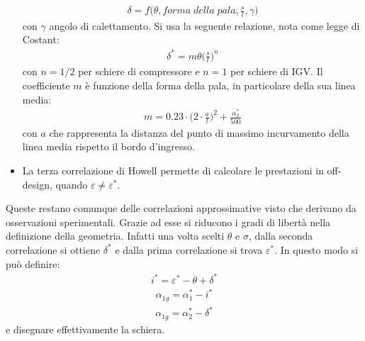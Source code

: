 \begin{itemize}
	\begin{align*}
	\delta = f \bigg( \theta, forma \; della \; pala, \frac{s}{l}, \gamma \bigg)
	\end{align*}
	con $\gamma$ angolo di calettamento. Si usa la seguente relazione, nota come legge di Costant:
	\begin{align*}
	\delta^* = m \theta \bigg( \frac{s}{l} \bigg)^n
	\end{align*}
	con $n = 1/2$ per schiere di compressore e $n = 1$ per schiere di IGV. Il coefficiente $m$ è funzione della forma della pala, in particolare della sua linea media:
	\begin{align*}
	m = 0.23 \cdot \bigg( 2 \cdot \frac{a}{l} \bigg)^2 + \frac{\alpha_2^*}{500}
	\end{align*}
	con $a$ che rappresenta la distanza del punto di massimo incurvamento della linea media rispetto il bordo d'ingresso.
	\item La terza correlazione di Howell permette di calcolare le prestazioni in off-design, quando $\varepsilon \neq \varepsilon^*$.
\end{itemize}
Queste restano comunque delle correlazioni approssimative visto che derivano da osservazioni sperimentali. Grazie ad esse si riducono i gradi di libertà nella definizione della geometria. Infatti una volta scelti $ \theta$ e $\sigma $, dalla seconda correlazione si ottiene $ \delta^* $ e dalla prima correlazione si trova $ \varepsilon^* $. In questo modo si può definire:
\begin{align*}
i^* = \varepsilon^* - \theta + \delta^*
\end{align*}
\begin{align*}
\alpha_{1g} = \alpha_1^* - i^*
\end{align*}
\begin{align*}
\alpha_{1g} = \alpha_2^* - \delta^*
\end{align*}
e disegnare effettivamente la schiera. 


